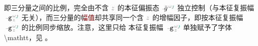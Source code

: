 即三分量之间的比例，完全由不含 $\mathcolor{gray}{z}$ 的\textcolor{PineGreen}{本征偏振态} $\Xint{{}^{}_{\mathcolor{gray}{-}}}{10}{\bar{g}}^{\;\!\mathcolor{gray}{\omega} \textcolor{PineGreen}{\jmath}}$ 独立控制（与\textcolor{PineGreen}{本征复振幅} $\Xint{\begin{smallmatrix} ~ \\ {}^{}_{\mathcolor{gray}{-}} \\ ~ \end{smallmatrix}}{09}{\mathtt{g}}^{\;\!\mathcolor{gray}{\omega} \textcolor{PineGreen}{\jmath}}_{\;\! \mathcolor{gray}{z}}$ 无关），而三分量的\textcolor{Maroon}{幅值}却共享同一个含 $\mathcolor{gray}{z}$ 的增幅因子，即按\textcolor{PineGreen}{本征复振幅} $\Xint{\begin{smallmatrix} ~ \\ {}^{}_{\mathcolor{gray}{-}} \\ ~ \end{smallmatrix}}{09}{\mathtt{g}}^{\;\!\mathcolor{gray}{\omega} \textcolor{PineGreen}{\jmath}}_{\;\! \mathcolor{gray}{z}}$ 的比例同步缩放。注意，这里只给 \textcolor{PineGreen}{本征复振幅} $\Xint{\begin{smallmatrix} ~ \\ {}^{}_{\mathcolor{gray}{-}} \\ ~ \end{smallmatrix}}{09}{\mathtt{g}}^{\;\!\mathcolor{gray}{\omega} \textcolor{PineGreen}{\jmath}}_{\;\! \mathcolor{gray}{z}}$ 单独赋予了字体 \textbackslash mathtt，见 。

